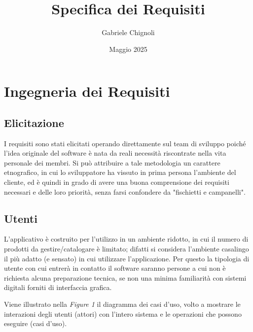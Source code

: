 \documentclass{article}
\title{\huge Specifica dei Requisiti}
\author{Gabriele Chignoli}
\date{Maggio 2025}
\begin{document}
\maketitle
\tableofcontents
\newpage

\section{Ingegneria dei Requisiti}
\subsection{Elicitazione}
I requisiti sono stati elicitati operando direttamente sul team di sviluppo poiché l'idea originale del software è nata da reali necessità riscontrate nella vita personale dei membri. Si può attribuire a tale metodologia un carattere etnografico, in cui lo sviluppatore ha vissuto in prima persona l'ambiente del cliente, ed è quindi in grado di avere una buona comprensione dei requisiti necessari e delle loro priorità, senza farsi confondere da "fischietti e campanelli".  

\subsection{Utenti}
L'applicativo è costruito per l'utilizzo in un ambiente ridotto, in cui il numero di prodotti da gestire/catalogare è limitato; difatti si considera l'ambiente casalingo il più adatto (e sensato) in cui utilizzare l'applicazione. Per questo la tipologia di utente con cui entrerà in contatto il software saranno persone a cui non è richiesta alcuna preparazione tecnica, se non una minima familiarità con sistemi digitali forniti di interfaccia grafica. \newline 

Viene illustrato nella \textit{Figure 1} il diagramma dei casi d'uso, volto a mostrare le interazioni degli utenti (attori) con l'intero sistema e le operazioni che possono eseguire (casi d'uso).
\end{document}
